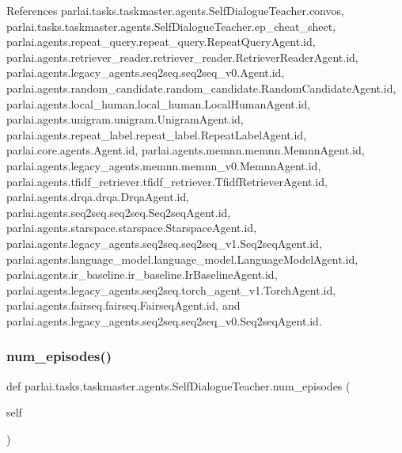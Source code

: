 References parlai.\+tasks.\+taskmaster.\+agents.\+Self\+Dialogue\+Teacher.\+convos, parlai.\+tasks.\+taskmaster.\+agents.\+Self\+Dialogue\+Teacher.\+ep\+\_\+cheat\+\_\+sheet, parlai.\+agents.\+repeat\+\_\+query.\+repeat\+\_\+query.\+Repeat\+Query\+Agent.\+id, parlai.\+agents.\+retriever\+\_\+reader.\+retriever\+\_\+reader.\+Retriever\+Reader\+Agent.\+id, parlai.\+agents.\+legacy\+\_\+agents.\+seq2seq.\+seq2seq\+\_\+v0.\+Agent.\+id, parlai.\+agents.\+random\+\_\+candidate.\+random\+\_\+candidate.\+Random\+Candidate\+Agent.\+id, parlai.\+agents.\+local\+\_\+human.\+local\+\_\+human.\+Local\+Human\+Agent.\+id, parlai.\+agents.\+unigram.\+unigram.\+Unigram\+Agent.\+id, parlai.\+agents.\+repeat\+\_\+label.\+repeat\+\_\+label.\+Repeat\+Label\+Agent.\+id, parlai.\+core.\+agents.\+Agent.\+id, parlai.\+agents.\+memnn.\+memnn.\+Memnn\+Agent.\+id, parlai.\+agents.\+legacy\+\_\+agents.\+memnn.\+memnn\+\_\+v0.\+Memnn\+Agent.\+id, parlai.\+agents.\+tfidf\+\_\+retriever.\+tfidf\+\_\+retriever.\+Tfidf\+Retriever\+Agent.\+id, parlai.\+agents.\+drqa.\+drqa.\+Drqa\+Agent.\+id, parlai.\+agents.\+seq2seq.\+seq2seq.\+Seq2seq\+Agent.\+id, parlai.\+agents.\+starspace.\+starspace.\+Starspace\+Agent.\+id, parlai.\+agents.\+legacy\+\_\+agents.\+seq2seq.\+seq2seq\+\_\+v1.\+Seq2seq\+Agent.\+id, parlai.\+agents.\+language\+\_\+model.\+language\+\_\+model.\+Language\+Model\+Agent.\+id, parlai.\+agents.\+ir\+\_\+baseline.\+ir\+\_\+baseline.\+Ir\+Baseline\+Agent.\+id, parlai.\+agents.\+legacy\+\_\+agents.\+seq2seq.\+torch\+\_\+agent\+\_\+v1.\+Torch\+Agent.\+id, parlai.\+agents.\+fairseq.\+fairseq.\+Fairseq\+Agent.\+id, and parlai.\+agents.\+legacy\+\_\+agents.\+seq2seq.\+seq2seq\+\_\+v0.\+Seq2seq\+Agent.\+id.

\mbox{\label{classparlai_1_1tasks_1_1taskmaster_1_1agents_1_1SelfDialogueTeacher_a20da7abc53d7a872ec5346bf81b61593}} 
\subsubsection{\texorpdfstring{num\+\_\+episodes()}{num\_episodes()}}
{\footnotesize\ttfamily def parlai.\+tasks.\+taskmaster.\+agents.\+Self\+Dialogue\+Teacher.\+num\+\_\+episodes (\begin{DoxyParamCaption}\item[{}]{self }\end{DoxyParamCaption})}



